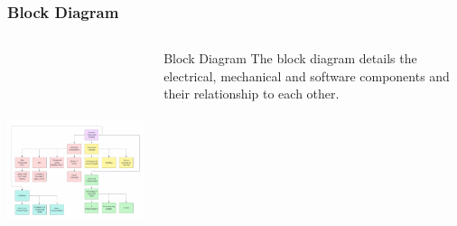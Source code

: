 \documentclass[aspectratio=169]{beamer}
\begin{document}
\begin{frame}
    \frametitle{Block Diagram}

    \begin{columns}
        \begin{column}{0.70\textwidth}
            \includegraphics[height=7cm]{BlockDiagram}
        \end{column}

        \begin{column}{0.30\textwidth}
            \begin{block}{Block Diagram}
                The block diagram details the electrical, mechanical and software components and their relationship to each other.
            \end{block}
        \end{column}
    \end{columns}


\end{frame}
\end{document}
